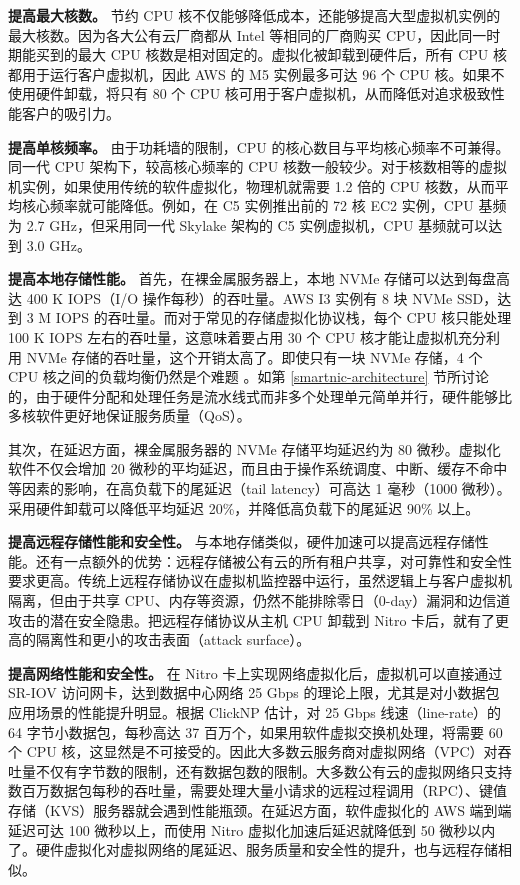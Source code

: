 \textbf{提高最大核数。}
节约 CPU 核不仅能够降低成本，还能够提高大型虚拟机实例的最大核数。因为各大公有云厂商都从 Intel 等相同的厂商购买 CPU，因此同一时期能买到的最大 CPU 核数是相对固定的。虚拟化被卸载到硬件后，所有 CPU 核都用于运行客户虚拟机，因此 AWS 的 M5 实例最多可达 96 个 CPU 核。如果不使用硬件卸载，将只有 80 个 CPU 核可用于客户虚拟机，从而降低对追求极致性能客户的吸引力。

\textbf{提高单核频率。}
由于功耗墙的限制，CPU 的核心数目与平均核心频率不可兼得。同一代 CPU 架构下，较高核心频率的 CPU 核数一般较少。对于核数相等的虚拟机实例，如果使用传统的软件虚拟化，物理机就需要 1.2 倍的 CPU 核数，从而平均核心频率就可能降低。例如，在 C5 实例推出前的 72 核 EC2 实例，CPU 基频为 2.7 GHz，但采用同一代 Skylake 架构的 C5 实例虚拟机，CPU 基频就可以达到 3.0 GHz。

\textbf{提高本地存储性能。}
首先，在裸金属服务器上，本地 NVMe 存储可以达到每盘高达 400 K IOPS（I/O 操作每秒）的吞吐量。AWS I3 实例有 8 块 NVMe SSD，达到 3 M IOPS 的吞吐量。而对于常见的存储虚拟化协议栈，每个 CPU 核只能处理 100 K IOPS 左右的吞吐量，这意味着要占用 30 个 CPU 核才能让虚拟机充分利用 NVMe 存储的吞吐量，这个开销太高了。即使只有一块 NVMe 存储，4 个 CPU 核之间的负载均衡仍然是个难题 \cite{li2017kv}。如第 \ref{smartnic-architecture} 节所讨论的，由于硬件分配和处理任务是流水线式而非多个处理单元简单并行，硬件能够比多核软件更好地保证服务质量（QoS）。

其次，在延迟方面，裸金属服务器的 NVMe 存储平均延迟约为 80 微秒。虚拟化软件不仅会增加 20 微秒的平均延迟，而且由于操作系统调度、中断、缓存不命中等因素的影响，在高负载下的尾延迟（tail latency）可高达 1 毫秒（1000 微秒）。采用硬件卸载可以降低平均延迟 20\%，并降低高负载下的尾延迟 90\% 以上。

\textbf{提高远程存储性能和安全性。}
与本地存储类似，硬件加速可以提高远程存储性能。还有一点额外的优势：远程存储被公有云的所有租户共享，对可靠性和安全性要求更高。传统上远程存储协议在虚拟机监控器中运行，虽然逻辑上与客户虚拟机隔离，但由于共享 CPU、内存等资源，仍然不能排除零日（0-day）漏洞和边信道攻击的潜在安全隐患。把远程存储协议从主机 CPU 卸载到 Nitro 卡后，就有了更高的隔离性和更小的攻击表面（attack surface）。

\textbf{提高网络性能和安全性。}
在 Nitro 卡上实现网络虚拟化后，虚拟机可以直接通过 SR-IOV 访问网卡，达到数据中心网络 25 Gbps 的理论上限，尤其是对小数据包应用场景的性能提升明显。根据 ClickNP \cite{li2016clicknp} 估计，对 25 Gbps 线速（line-rate）的 64 字节小数据包，每秒高达 37 百万个，如果用软件虚拟交换机处理，将需要 60 个 CPU 核，这显然是不可接受的。因此大多数云服务商对虚拟网络（VPC）对吞吐量不仅有字节数的限制，还有数据包数的限制。大多数公有云的虚拟网络只支持数百万数据包每秒的吞吐量，需要处理大量小请求的远程过程调用（RPC）、键值存储（KVS）服务器就会遇到性能瓶颈。在延迟方面，软件虚拟化的 AWS 端到端延迟可达 100 微秒以上，而使用 Nitro 虚拟化加速后延迟就降低到 50 微秒以内了。硬件虚拟化对虚拟网络的尾延迟、服务质量和安全性的提升，也与远程存储相似。

